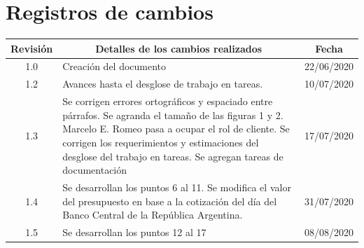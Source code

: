 \documentclass[11pt]{charter}
\begin{document}
\maketitle
\thispagestyle{empty}
\pagebreak


\thispagestyle{empty}
{\setlength{\parskip}{0pt}
\tableofcontents{}
}
\pagebreak


\section{Registros de cambios}
\label{sec:registro}


\begin{table}[ht]
\label{tab:registro}
\centering

\begin{tabularx}{\linewidth}{@{}|c|X|c|@{}}
\hline
\rowcolor[HTML]{C0C0C0} 
Revisión & \multicolumn{1}{c|}{\cellcolor[HTML]{C0C0C0}Detalles de los cambios realizados} & Fecha      \\ \hline
1.0      & Creación del documento                                                          & 22/06/2020 \\ \hline
1.2      & Avances hasta el desglose de trabajo en tareas.                                 & 10/07/2020 \\ \hline
1.3      & Se corrigen errores ortográficos y espaciado entre párrafos. \newline
	Se agranda el tamaño de las figuras 1 y 2.\newline
	Marcelo E. Romeo pasa a ocupar el rol de cliente.\newline
	Se corrigen los requerimientos y estimaciones del desglose del trabajo en tareas.\newline
	Se agregan tareas de documentación
& 17/07/2020 \\ \hline

1.4      & Se desarrollan los puntos 6 al 11.\newline
	Se modifica el valor del presupuesto en base a la cotización del día del Banco Central de la República Argentina.\newline
& 31/07/2020 \\ \hline
1.5      & Se desarrollan los puntos 12 al 17                                                  & 08/08/2020 \\ \hline
\end{tabularx}
\end{table}

\pagebreak
\end{document}
